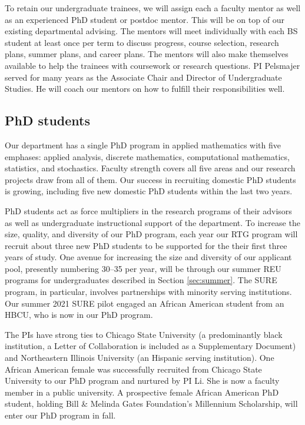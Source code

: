 \documentclass[11pt]{NSFamsart}
\begin{document}
To retain our undergraduate trainees, we will assign each a faculty mentor as well as an experienced PhD student or postdoc mentor.  This will be on top of our existing departmental advising.  The mentors will meet individually with each BS student at least once per term to discuss progress, course selection, research plans, summer plans, and career plans.  The mentors will also make themselves available to help the trainees with coursework or research questions.  PI Pelsmajer served for many years as the Associate Chair and Director of Undergraduate Studies. He will coach our mentors on how to fulfill their responsibilities well.

\subsection*{PhD students} 
Our department has a single PhD program in applied mathematics with five emphases: applied analysis, discrete mathematics, computational mathematics, statistics, and stochastics.  Faculty strength covers all five areas and our research projects draw from all of them. Our success in recruiting domestic PhD students is growing, including five new domestic PhD students within the last two years. 

PhD students act as force multipliers in the research programs of their advisors as well as undergraduate instructional support of the department. To increase the size, quality, and diversity of our PhD program, each year our RTG program will recruit about three new PhD students to be supported for the their first three years of study.  One avenue for increasing the size and diversity of our applicant pool, presently numbering 30--35 per year, will be through our summer REU programs for undergraduates described in Section \ref{sec:summer}.  The SURE program, in particular, involves partnerships with minority serving institutions.  Our summer 2021 SURE pilot engaged an African American student from an HBCU, who is now in our PhD program.  





The PIs have strong ties to Chicago State University (a predominantly black institution, a Letter of Collaboration is included as a Supplementary Document) and Northeastern Illinois University (an Hispanic serving institution). One African American female was successfully recruited from Chicago State University to our PhD program and nurtured by PI Li.  She is now a faculty member in a public university. A prospective female  African American  PhD student, holding Bill \& Melinda Gates Foundation's Millennium Scholarship, will enter our PhD program in fall. 
\end{document}
